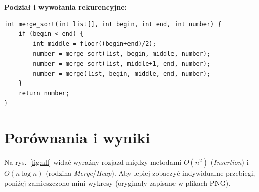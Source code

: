 \documentclass[11pt,a4paper]{article}
\begin{document}
\noindent\textbf{Podział i wywołania rekurencyjne:}
\begin{lstlisting}[style=cppstyle,caption={Rekurencyjny podział i łączenie.},label={lst:mergesort}]
int merge_sort(int list[], int begin, int end, int number) {
    if (begin < end) {
        int middle = floor((begin+end)/2);
        number = merge_sort(list, begin, middle, number);
        number = merge_sort(list, middle+1, end, number);
        number = merge(list, begin, middle, end, number);
    }
    return number;
}
\end{lstlisting}


\section{Porównania i wyniki}
Na rys.~\ref{fig:all} widać wyraźny rozjazd między metodami $O(n^2)$ (\emph{Insertion}) i $O(n\log n)$ (rodzina \emph{Merge}/\emph{Heap}). Aby lepiej zobaczyć indywidualne przebiegi, poniżej zamieszczono mini-wykresy (oryginały zapisane w plikach PNG).
\end{document}
